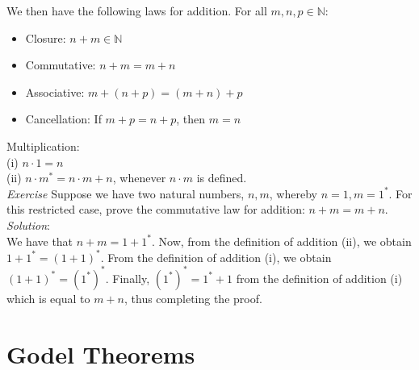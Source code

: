 We then have the following laws for addition.  For all $m,n,p \in \mathbb{N}$:\\
\begin{itemize}
\item Closure: $n+m \in \mathbb{N}$
\item Commutative: $n+m=m+n$
\item Associative: $m + ( n+p) =(m+n)+p$
\item Cancellation: If $m+p=n+p$, then $m=n$
\end{itemize}

Multiplication:\\
(i) $n \cdot 1 = n$\\
(ii) $n \cdot m^{*}=n \cdot m + n$, whenever $n \cdot m$ is defined.\\


\textit{Exercise} Suppose we have two natural numbers, $n,m$, whereby $n=1, m=1^{*}$.  For this restricted case, prove the commutative law for addition: $n+m=m+n$.\\
\textit{Solution}:\\
We have that $n+m=1+1^{*}$.  Now, from the definition of addition (ii), we obtain $1+1^{*}=(1+1)^{*}$.  From the definition of addition (i), we obtain $(1+1)^{*}=(1^{*})^{*}$.  Finally, $(1^{*})^{*}=1^{*}+1$ from the definition of addition (i) which is equal to $m+n$, thus completing the proof.

\section{Godel Theorems}